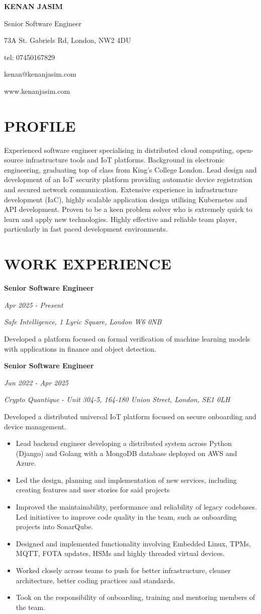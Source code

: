 \documentclass[11pt,a4paper]{article}
\newcommand{\header}[6]{
    \noindent
    \begin{minipage}[t]{0.6\textwidth}
        {\Huge\bfseries #1}
        
        \vspace{5pt}
        {\Large #2}
    \end{minipage}%
    \hfill
    \begin{minipage}[t]{0.35\textwidth}
        \raggedleft
        #3
        
        tel: #4
        
        #5
        
        #6
    \end{minipage}
    
    \vspace{20pt}
}
\newcommand{\cventry}[5]{
    \noindent
    \begin{minipage}[t]{0.3\textwidth}
        \raggedright
        \textbf{#1}
        
        \textit{#2}
    \end{minipage}%
    \hfill
    \begin{minipage}[t]{0.7\textwidth}
        \raggedright
        \textit{#3}
        
        #4
        
        #5
    \end{minipage}
    
    \vspace{8pt}
}
\begin{document}
\header{KENAN JASIM}{Senior Software Engineer}{73A St. Gabriels Rd, London, NW2 4DU}{07450167829}{kenan@kenanjasim.com}{www.kenanjasim.com}

\section{PROFILE}
Experienced software engineer specialising in distributed cloud computing, open-source infrastructure tools and IoT platforms. Background in electronic engineering, graduating top of class from King's College London. Lead design and development of an IoT security platform providing automatic device registration and secured network communication. Extensive experience in infrastructure development (IaC), highly scalable application design utilising Kubernetes and API development. Proven to be a keen problem solver who is extremely quick to learn and apply new technologies. Highly effective and reliable team player, particularly in fast paced development environments.

\section{WORK EXPERIENCE}

\cventry{Senior Software Engineer}{Apr 2025 - Present}{Safe Intelligence, 1 Lyric Square, London W6 0NB}{}{
Developed a platform focused on formal verification of machine learning models with applications in finance and object detection.
}

\cventry{Senior Software Engineer}{Jun 2022 - Apr 2025}{Crypto Quantique - Unit 304-5, 164-180 Union Street, London, SE1 0LH}{}{
Developed a distributed universal IoT platform focused on secure onboarding and device management.
\begin{itemize}[leftmargin=15pt, itemsep=2pt]
    \item Lead backend engineer developing a distributed system across Python (Django) and Golang with a MongoDB database deployed on AWS and Azure.
    \item Led the design, planning and implementation of new services, including creating features and user stories for said projects
    \item Improved the maintainability, performance and reliability of legacy codebases. Led initiatives to improve code quality in the team, such as onboarding projects into SonarQube.
    \item Designed and implemented functionality involving Embedded Linux, TPMs, MQTT, FOTA updates, HSMs and highly threaded virtual devices.
    \item Worked closely across teams to push for better infrastructure, cleaner architecture, better coding practices and standards.
    \item Took on the responsibility of onboarding, training and mentoring members of the team.
\end{itemize}
}
\end{document}
